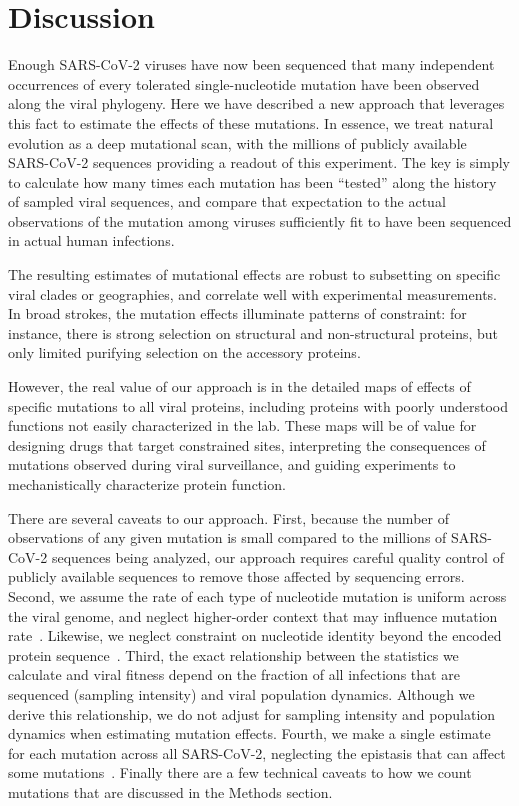\documentclass[9pt,twocolumn,twoside]{gsajnl_modified}
\begin{document}
\section{Discussion}

Enough SARS-CoV-2 viruses have now been sequenced that many independent occurrences of every tolerated single-nucleotide mutation have been observed along the viral phylogeny.
Here we have described a new approach that leverages this fact to estimate the effects of these mutations.
In essence, we treat natural evolution as a deep mutational scan, with the millions of publicly available SARS-CoV-2 sequences providing a readout of this experiment.
The key is simply to calculate how many times each mutation has been ``tested'' along the history of sampled viral sequences, and compare that expectation to the actual observations of the mutation among viruses sufficiently fit to have been sequenced in actual human infections.

The resulting estimates of mutational effects are robust to subsetting on specific viral clades or geographies, and correlate well with experimental measurements.
In broad strokes, the mutation effects illuminate patterns of constraint: for instance, there is strong selection on structural and non-structural proteins, but only limited purifying selection on the accessory proteins.

However, the real value of our approach is in the detailed maps of effects of specific mutations to all viral proteins, including proteins with poorly understood functions not easily characterized in the lab.
These maps will be of value for designing drugs that target constrained sites, interpreting the consequences of mutations observed during viral surveillance, and guiding experiments to mechanistically characterize protein function.

There are several caveats to our approach.
First, because the number of observations of any given mutation is small compared to the millions of SARS-CoV-2 sequences being analyzed, our approach requires careful quality control of publicly available sequences to remove those affected by sequencing errors.
Second, we assume the rate of each type of nucleotide mutation is uniform across the viral genome, and neglect higher-order context that may influence mutation rate~\citep{sadykov2021short,beale2004comparison}.
Likewise, we neglect constraint on nucleotide identity beyond the encoded protein sequence~\citep{huston2021comprehensive,kuo2013functional}.
Third, the exact relationship between the statistics we calculate and viral fitness depend on the fraction of all infections that are sequenced (sampling intensity) and viral population dynamics.
Although we derive this relationship, we do not adjust for sampling intensity and population dynamics when estimating mutation effects.
Fourth, we make a single estimate for each mutation across all SARS-CoV-2, neglecting the epistasis that can affect some mutations~\citep{starr2022shifting,moulana2022compensatory}.
Finally there are a few technical caveats to how we count mutations that are discussed in the Methods section.
\end{document}
